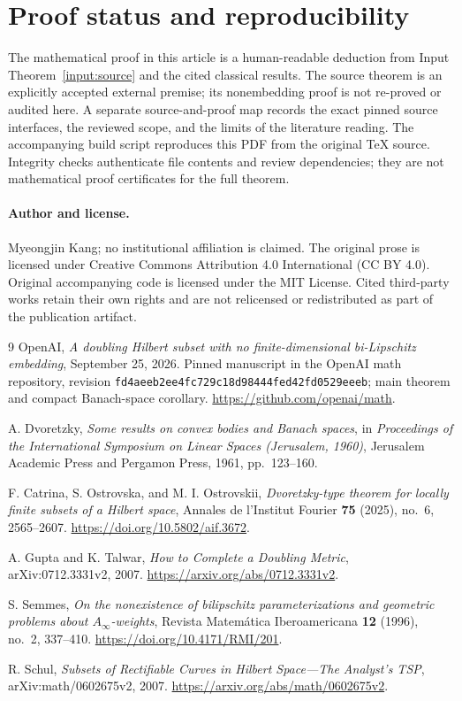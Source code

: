 \documentclass[11pt,a4paper]{article}
\theoremstyle{definition}
\theoremstyle{remark}
\numberwithin{equation}{section}
\begin{document}
\section{Proof status and reproducibility}

The mathematical proof in this article is a human-readable deduction from Input Theorem~\ref{input:source} and the cited classical results. The source theorem is an explicitly accepted external premise; its nonembedding proof is not re-proved or audited here. A separate source-and-proof map records the exact pinned source interfaces, the reviewed scope, and the limits of the literature reading. The accompanying build script reproduces this PDF from the original TeX source. Integrity checks authenticate file contents and review dependencies; they are not mathematical proof certificates for the full theorem.

\paragraph{Author and license.}
Myeongjin Kang; no institutional affiliation is claimed. The original prose is licensed under Creative Commons Attribution 4.0 International (CC BY 4.0). Original accompanying code is licensed under the MIT License. Cited third-party works retain their own rights and are not relicensed or redistributed as part of the publication artifact.

\begin{thebibliography}{9}
OpenAI, \emph{A doubling Hilbert subset with no finite-dimensional bi-Lipschitz embedding}, September 25, 2026. Pinned manuscript in the OpenAI math repository, revision \texttt{fd4aeeb2ee4fc729c18d98444fed42fd0529eeeb}; main theorem and compact Banach-space corollary. \url{https://github.com/openai/math}.

A. Dvoretzky, \emph{Some results on convex bodies and Banach spaces}, in \emph{Proceedings of the International Symposium on Linear Spaces (Jerusalem, 1960)}, Jerusalem Academic Press and Pergamon Press, 1961, pp.~123--160.

F. Catrina, S. Ostrovska, and M. I. Ostrovskii, \emph{Dvoretzky-type theorem for locally finite subsets of a Hilbert space}, Annales de l'Institut Fourier \textbf{75} (2025), no.~6, 2565--2607. \url{https://doi.org/10.5802/aif.3672}.

A. Gupta and K. Talwar, \emph{How to Complete a Doubling Metric}, arXiv:0712.3331v2, 2007. \url{https://arxiv.org/abs/0712.3331v2}.

S. Semmes, \emph{On the nonexistence of bilipschitz parameterizations and geometric problems about $A_\infty$-weights}, Revista Matem\'atica Iberoamericana \textbf{12} (1996), no.~2, 337--410. \url{https://doi.org/10.4171/RMI/201}.

R. Schul, \emph{Subsets of Rectifiable Curves in Hilbert Space---The Analyst's TSP}, arXiv:math/0602675v2, 2007. \url{https://arxiv.org/abs/math/0602675v2}.
\end{thebibliography}
\end{document}
